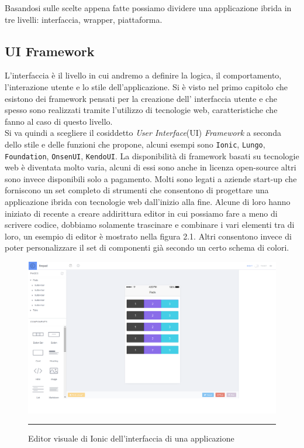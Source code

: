 Basandosi sulle scelte appena fatte possiamo dividere una applicazione ibrida in tre livelli: interfaccia, wrapper, piattaforma.
\subsection{UI Framework}
L'interfaccia è il livello in cui andremo a definire la logica, il comportamento, l'interazione utente e lo stile dell'applicazione. Si è visto nel primo capitolo che esistono dei framework pensati per la creazione dell' interfaccia utente e che spesso sono realizzati tramite l'utilizzo di tecnologie web, caratteristiche che fanno al caso di questo livello.\\
Si va quindi a scegliere il cosiddetto \emph{User Interface}(UI) \emph{Framework} a seconda dello stile e delle funzioni che propone, alcuni esempi sono \texttt{Ionic}, \texttt{Lungo}, \texttt{Foundation}, \texttt{OnsenUI}, \texttt{KendoUI}. La disponibilità di framework basati su tecnologie web è diventata molto varia, alcuni di essi sono anche in licenza open-source altri sono invece disponibili solo a pagamento. Molti sono legati a aziende start-up che forniscono un set completo di strumenti che consentono di progettare una applicazione ibrida con tecnologie web dall'inizio alla fine. Alcune di loro hanno iniziato di recente a creare addirittura editor in cui possiamo fare a meno di scrivere codice, dobbiamo solamente trascinare e combinare i vari elementi tra di loro, un esempio di editor è mostrato nella figura 2.1. Altri consentono invece di poter personalizzare il set di componenti già secondo un certo schema di colori.
\clearpage
\begin{figure}[!t]
	\centering
		\includegraphics[scale=0.4]{Figures/ui_editor.png}
		\rule{35em}{0.5pt}
	\caption[Editor]{Editor visuale di Ionic dell'interfaccia di una applicazione}
\label{fig:Editor visuale dell'interfaccia di una applicazione}
\end{figure}


